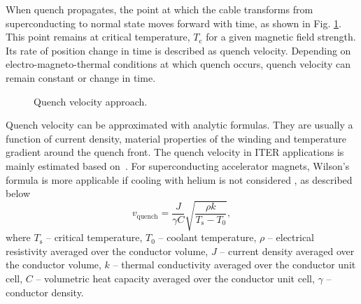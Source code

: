
When quench propagates, the point at which the cable transforms from superconducting to normal state moves forward with time, as shown in Fig. \ref{fig:modelling_approach}. This point remains at critical temperature, $T_\text{c}$ for a given magnetic field strength. Its rate of position change in time is described as quench velocity. Depending on electro-magneto-thermal conditions at which quench occurs, quench velocity can remain constant or change in time. 

\begin{figure}[H]
\centering
{}
\caption{Quench velocity approach.}
\label{fig:modelling_approach}
\end{figure}

Quench velocity can be approximated with analytic formulas. They are usually a function of current density, material properties of the winding and temperature gradient around the quench front. The quench velocity in ITER applications is mainly estimated based on~\cite{MIT_phd_thesis}. For superconducting accelerator magnets, Wilson's formula is more applicable if cooling with helium is not considered \cite[p.~206]{wilson1987superconducting}, as described below
\begin{equation}
    v_\text{quench}=\frac{J}{\gamma C}\sqrt{\frac{\rho k}{T_\text{s}-T_\text{0}}},
    \label{eqn:Wilson_quench_velocity_formula}
\end{equation}
where $T_\text{s}$ -- critical temperature,
$T_\text{0}$ -- coolant temperature,
$\rho$ -- electrical resistivity averaged over the conductor volume,
$J$ -- current density averaged over the conductor volume,
$k$ -- thermal conductivity averaged over the conductor unit cell,
$C$ -- volumetric heat capacity averaged over the conductor unit cell,
$\gamma$ -- conductor density.
